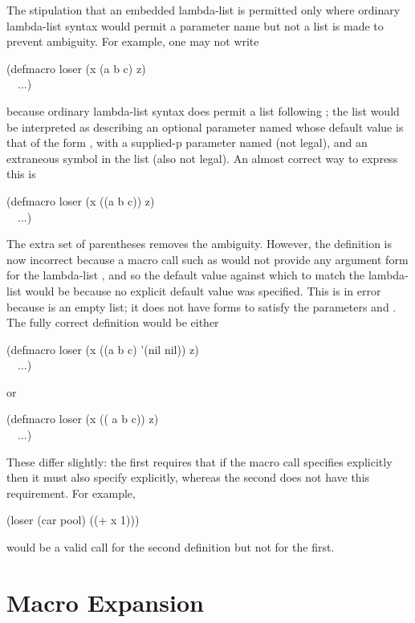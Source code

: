 \begin{defmac}
The stipulation that
an embedded lambda-list is permitted only
where ordinary lambda-list syntax would permit a parameter name
but not a list is made to prevent ambiguity.  For example,
one may not write
\begin{lisp}
(defmacro loser (x  (a b  c)  z) \\
~~...)
\end{lisp}
because ordinary lambda-list syntax does permit a list following ;
the list  would be interpreted as describing an
optional parameter named  whose default value is that of the
form , with a supplied-p parameter named  (not legal),
and an extraneous symbol  in the list (also not legal).  An almost
correct way to express this is
\begin{lisp}
(defmacro loser (x  ((a b  c))  z) \\
~~...)
\end{lisp}
The extra set of parentheses removes the ambiguity.  However, the
definition is now incorrect because a macro call such as 
would not provide any argument form for the lambda-list ,
and so the default value against which to match the lambda-list would be
{\nil} because no explicit default value was specified.  This is in error
because {\nil} is an empty list; it does not have forms to satisfy the
parameters  and .  The fully correct definition would be either
\begin{lisp}
(defmacro loser (x  ((a b  c) '(nil nil))  z) \\
~~...)
\end{lisp}
or
\begin{lisp}
(defmacro loser (x  (( a b  c))  z) \\
~~...)
\end{lisp}
These differ slightly: the first requires that if the macro call
specifies  explicitly then it must also specify  explicitly,
whereas the second does not have this requirement.  For example,
\begin{lisp}
(loser (car pool) ((+ x 1)))
\end{lisp}
would be a valid call for the second definition but not for the first.
\end{defmac}

\section{Macro Expansion}

